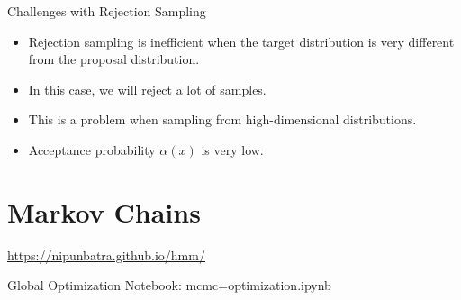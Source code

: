 \documentclass{beamer}
\begin{document}
    \begin{frame}{Challenges with Rejection Sampling}
        \begin{itemize}
            \item Rejection sampling is inefficient when the target distribution is very different from the proposal distribution.
            \item In this case, we will reject a lot of samples.
            \item This is a problem when sampling from high-dimensional distributions.
            \item Acceptance probability $\alpha(x)$ is very low.
        \end{itemize}
    \end{frame}


\section{Markov Chains}
\begin{frame}
    \url{https://nipunbatra.github.io/hmm/}
\end{frame}

\begin{frame}{Global Optimization}
    Notebook: mcmc=optimization.ipynb
    
\end{frame}
\end{document}

